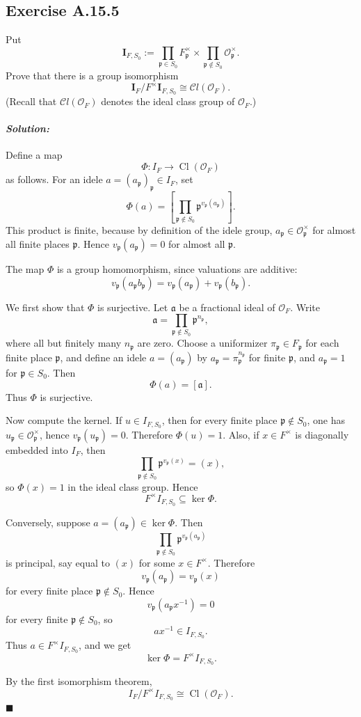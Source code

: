 \documentclass[12pt, a4paper]{article}
\newenvironment{solution}
  {\paragraph{\textit{Solution:}}\par\medskip}
  {\hfill$\blacksquare$\vspace{0.1cm}}
\begin{document}
\subsection*{Exercise A.15.5}
Put
\[ \mathbf{I}_{F, S_0} := \prod_{\mathfrak{p} \in S_0} F_{\mathfrak{p}}^\times \times \prod_{\mathfrak{p} \notin S_0} \mathcal{O}_{\mathfrak{p}}^\times . \]
Prove that there is a group isomorphism
\[ \mathbf{I}_F / F^\times \mathbf{I}_{F, S_0} \cong \mathcal{C}l(\mathcal{O}_F) . \]
(Recall that $\mathcal{C}l(\mathcal{O}_F)$ denotes the ideal class group of $\mathcal{O}_F$.)
\begin{solution}
Define a map
\[
\Phi:I_F\longrightarrow \operatorname{Cl}(\mathcal O_F)
\]
as follows. For an idele \(a=(a_{\mathfrak p})_{\mathfrak p}\in I_F\), set
\[
\Phi(a)=\left[\prod_{\mathfrak p\notin S_0}
\mathfrak p^{v_{\mathfrak p}(a_{\mathfrak p})}\right].
\]
This product is finite, because by definition of the idele group,
\(a_{\mathfrak p}\in\mathcal O_{\mathfrak p}^{\times}\) for almost all finite
places \(\mathfrak p\). Hence \(v_{\mathfrak p}(a_{\mathfrak p})=0\) for almost
all \(\mathfrak p\).

The map \(\Phi\) is a group homomorphism, since valuations are additive:
\[
v_{\mathfrak p}(a_{\mathfrak p}b_{\mathfrak p})
=
v_{\mathfrak p}(a_{\mathfrak p})+v_{\mathfrak p}(b_{\mathfrak p}).
\]

We first show that \(\Phi\) is surjective. Let \(\mathfrak a\) be a fractional
ideal of \(\mathcal O_F\). Write
\[
\mathfrak a=\prod_{\mathfrak p\notin S_0}\mathfrak p^{n_{\mathfrak p}},
\]
where all but finitely many \(n_{\mathfrak p}\) are zero. Choose a uniformizer
\(\pi_{\mathfrak p}\in F_{\mathfrak p}\) for each finite place
\(\mathfrak p\), and define an idele \(a=(a_{\mathfrak p})\) by
\(a_{\mathfrak p}=\pi_{\mathfrak p}^{n_{\mathfrak p}}\) for finite
\(\mathfrak p\), and \(a_{\mathfrak p}=1\) for \(\mathfrak p\in S_0\). Then
\[
\Phi(a)=[\mathfrak a].
\]
Thus \(\Phi\) is surjective.

Now compute the kernel. If \(u\in I_{F,S_0}\), then for every finite place
\(\mathfrak p\notin S_0\), one has \(u_{\mathfrak p}\in
\mathcal O_{\mathfrak p}^{\times}\), hence
\(v_{\mathfrak p}(u_{\mathfrak p})=0\). Therefore \(\Phi(u)=1\). Also, if
\(x\in F^\times\) is diagonally embedded into \(I_F\), then
\[
\prod_{\mathfrak p\notin S_0}
\mathfrak p^{v_{\mathfrak p}(x)}
=(x),
\]
so \(\Phi(x)=1\) in the ideal class group. Hence
\[
F^\times I_{F,S_0}\subseteq \ker \Phi.
\]

Conversely, suppose \(a=(a_{\mathfrak p})\in\ker\Phi\). Then
\[
\prod_{\mathfrak p\notin S_0}
\mathfrak p^{v_{\mathfrak p}(a_{\mathfrak p})}
\]
is principal, say equal to \((x)\) for some \(x\in F^\times\). Therefore
\[
v_{\mathfrak p}(a_{\mathfrak p})
=
v_{\mathfrak p}(x)
\]
for every finite place \(\mathfrak p\notin S_0\). Hence
\[
v_{\mathfrak p}(a_{\mathfrak p}x^{-1})=0
\]
for every finite \(\mathfrak p\notin S_0\), so
\[
a x^{-1}\in I_{F,S_0}.
\]
Thus \(a\in F^\times I_{F,S_0}\), and we get
\[
\ker\Phi=F^\times I_{F,S_0}.
\]

By the first isomorphism theorem,
\[
I_F/F^\times I_{F,S_0}\cong \operatorname{Cl}(\mathcal O_F).
\]
\end{solution}
\end{document}
